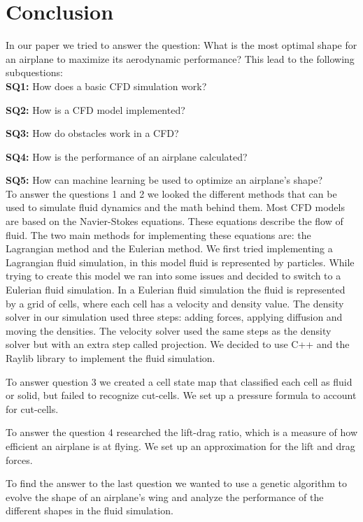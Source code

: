 \documentclass[a4paper,12pt,titlepage]{article}
\begin{document}
\pagebreak
\section{Conclusion}
In our paper we tried to answer the question: What is the most optimal shape for an airplane to maximize its aerodynamic performance?
This lead to the following subquestions:  \\

\textbf{SQ1:} How does a basic CFD simulation work?

\textbf{SQ2:} How is a CFD model implemented?

\textbf{SQ3:} How do obstacles work in a CFD?

\textbf{SQ4:} How is the performance of an airplane calculated?

\textbf{SQ5:} How can machine learning be used to optimize an airplane's shape? \\

To answer the questions 1 and 2 we looked the different methods that can be used to simulate fluid dynamics and the math behind them.
Most CFD models are based on the Navier-Stokes equations. These equations describe the flow of fluid. 
The two main methods for implementing these equations are: the Lagrangian method and the Eulerian method. 
We first tried implementing a Lagrangian fluid simulation, in this model fluid is represented by particles.
While trying to create this model we ran into some issues and decided to switch to a Eulerian fluid simulation.
In a Eulerian fluid simulation the fluid is represented by a grid of cells, where each cell has a velocity and density value.
The density solver in our simulation used three steps: adding forces, applying diffusion and moving the densities.
The velocity solver used the same steps as the density solver but with an extra step called projection.
We decided to use C++ and the Raylib library to implement the fluid simulation. 

To answer question 3 we created a cell state map that classified each cell as fluid or solid, but failed to recognize cut-cells.
We set up a pressure formula to account for cut-cells.

To answer the question 4 researched the lift-drag ratio, which is a measure of how efficient an airplane is at flying.
We set up an approximation for the lift and drag forces.

To find the answer to the last question we wanted to use a genetic algorithm to evolve the shape of an airplane's wing 
and analyze the performance of the different shapes in the fluid simulation. 
\end{document}

